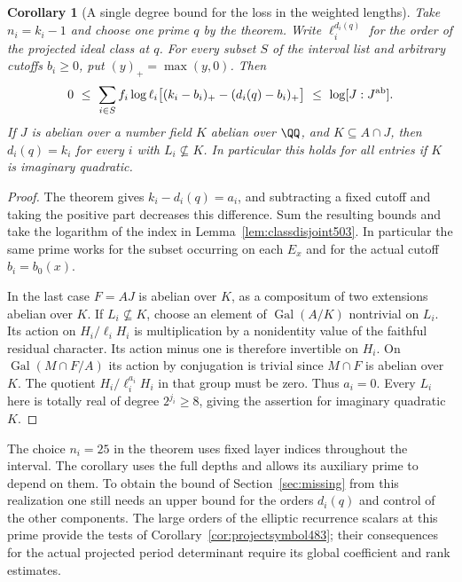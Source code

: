\documentclass[a4paper,11pt]{article}
\newtheorem{corollary}[proposition]{Corollary}
\theoremstyle{definition}
\theoremstyle{remark}
\numberwithin{equation}{section}
\begin{document}
\begin{corollary}[A single degree bound for the loss in the weighted lengths]\leavevmode
\label{cor:classmass503}
Take \(n_i=k_i-1\) and choose one prime \(q\) by the theorem.
Write \(\ell_i^{d_i(q)}\) for the order of the projected ideal
class at \(q\). For every subset \(S\) of the interval list and
arbitrary cutoffs \(b_i\ge0\), put \((y)_+=\max(y,0)\). Then
\[
 \begin{aligned}
 0\ \le\ 
 \sum_{i\in S} f_i\log\ell_i
     \big[(k_i-b_i)_+-(d_i(q)-b_i)_+\big]
       \ \le\ \log[J:J^{\rm ab}].
 \end{aligned}
\]
If \(J\) is abelian over a number field \(K\) abelian over
\(\QQ\), and \(K\subseteq A\cap J\), then \(d_i(q)=k_i\)
for every \(i\) with \(L_i\not\subseteq K\). In particular this
holds for all entries if \(K\) is imaginary quadratic.
\end{corollary}
\begin{proof}
The theorem gives \(k_i-d_i(q)=a_i\), and subtracting a fixed
cutoff and taking the positive part decreases this difference.
Sum the resulting bounds and take the logarithm of the index
in Lemma~\ref{lem:classdisjoint503}. In particular the same
prime works for the subset occurring on each \(E_x\) and for the
actual cutoff \(b_i=b_0(x)\).

In the last case \(F=AJ\) is abelian over \(K\), as a
compositum of two extensions abelian over \(K\). If
\(L_i\not\subseteq K\), choose an element of
\(\operatorname{Gal}(A/K)\) nontrivial on \(L_i\). Its action
on \(H_i/\ell_i H_i\) is multiplication by a nonidentity value
of the faithful residual character. Its action minus one is
therefore invertible on \(H_i\). On
\(\operatorname{Gal}(M\cap F/A)\) its action by conjugation is
trivial since \(M\cap F\) is abelian over \(K\). The quotient
\(H_i/\ell_i^{a_i}H_i\) in that group must be zero. Thus \(a_i=0\).
Every \(L_i\) here is totally real of degree \(2^{j_i}\ge8\),
giving the assertion for imaginary quadratic \(K\).
\end{proof}

The choice \(n_i=25\) in the theorem uses fixed layer indices
throughout the interval. The corollary uses the full depths and
allows its auxiliary prime to depend on them. To obtain the
bound of Section~\ref{sec:missing} from this realization one
still needs an upper bound for the orders \(d_i(q)\) and control
of the other components. The large orders of the elliptic
recurrence scalars at this prime provide the tests of
Corollary~\ref{cor:projectsymbol483}; their consequences for
the actual projected period determinant require its global
coefficient and rank estimates.
\end{document}
